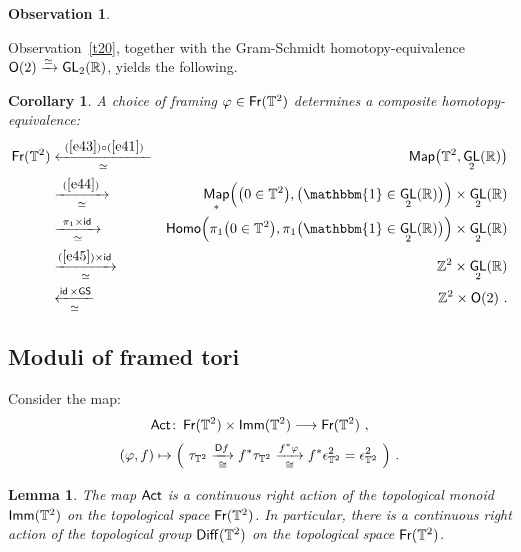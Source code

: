 \documentclass{amsart}
\newtheorem{lemma}[theorem]{Lemma}
\newtheorem{cor}[theorem]{Corollary}
\theoremstyle{definition}
\newtheorem{observation}[theorem]{Observation}
\theoremstyle{remark}
\DeclareMathOperator{\Map}{{\sf Map}}
\DeclareMathOperator{\Diff}{{\sf Diff}}
\newcommand{\xra}{\xrightarrow}
\newcommand{\xla}{\xleftarrow}
\DeclareMathOperator{\uno}{\mathbbm{1}}
\DeclareMathOperator{\GL}{\sf GL}
\DeclareMathOperator{\Fr}{\sf Fr}
\DeclareMathOperator{\id}{\sf id}
\DeclareMathOperator{\Act}{\sf Act}
\DeclareMathOperator{\Imm}{\sf Imm}
\begin{document}
\begin{observation}
\begin{enumerate}
\end{enumerate}

\end{observation}




Observation~\ref{t20}, together with the Gram-Schmidt homotopy-equivalence $\sO(2) \xra{\simeq} \GL_2(\RR)$, yields the following.
\begin{cor}
\label{t25}
A choice of framing $\varphi \in \Fr(\TT^2)$ determines a composite homotopy-equivalence:
\begin{eqnarray*}
\Fr(\TT^2) 
&
\underset{\simeq}{
\xla{~(\ref{e43})\circ (\ref{e41})~}
}
&
\Map\bigl( \TT^2 , \GL_2(\RR) \bigr)
\\
\nonumber
&
\underset{\simeq}{
\xra{~(\ref{e44})~}
}
&
\Map_\ast \Bigl( \bigl( 0 \in \TT^2 \bigr) , \bigl( \uno \in \GL_2(\RR) \bigr) \Bigr) \times \GL_2(\RR) 
\\
\nonumber
&
\underset{\simeq}{
\xra{~\pi_1 \times \id ~}
}
&
{\sf Homo}\Bigl( \pi_1\bigl( 0 \in \TT^2 \bigr) , \pi_1\bigl( \uno \in \GL_2(\RR) \bigr) \Bigr) \times \GL_2(\RR) 
\\
\nonumber
&
\underset{\simeq}{
\xra{(\ref{e45}) \times \id }
}
&
\ZZ^2 \times \GL_2(\RR)
\\
\nonumber
&
\underset{\simeq}{
\xla{ \id \times {\sf GS}}
}
&
\ZZ^2 \times \sO(2)
~.
\end{eqnarray*}

\end{cor}




















\subsection{Moduli of framed tori}


Consider the map:
\[
\Act\colon
\Fr(\TT^2)
\times
\Imm(\TT^2)
\longrightarrow
\Fr(\TT^2)
~,
\]
\[
( \varphi , f )
\mapsto 
\Bigl(
~
\tau_{\TT^2} 
\underset{\cong}{\xra{\sD f}}
f^\ast \tau_{\TT^2}
\underset{\cong}{ \xra{f^\ast \varphi} }
f^\ast \epsilon^2_{\TT^2}
=
\epsilon^2_{\TT^2}
~
\Bigr)
~.
\]

\begin{lemma}
\label{t50}
The map $\Act$ is a continuous right action of the topological monoid $\Imm(\TT^2)$ on the topological space $\Fr(\TT^2)$.
In particular, there is a continuous right action of the topological group $\Diff(\TT^2)$ on the topological space $\Fr(\TT^2)$. 

\end{lemma}
\end{document}
